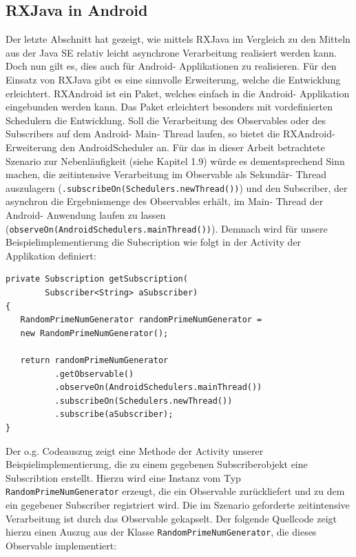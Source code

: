 \documentclass[12pt,oneside,a4paper,bibtotoc,liststotoc]{scrreprt}
\begin{document}
\subsection{RXJava in Android}
Der letzte Abschnitt hat gezeigt, wie mittels RXJava im Vergleich zu den Mitteln aus der Java SE relativ leicht asynchrone Verarbeitung realisiert werden kann. Doch nun gilt es, dies auch für Android- Applikationen zu realisieren. Für den Einsatz von RXJava gibt es eine sinnvolle Erweiterung, welche die Entwicklung erleichtert. RXAndroid ist ein Paket, welches einfach in die Android- Applikation eingebunden werden kann. Das Paket erleichtert besonders mit vordefinierten Schedulern die Entwicklung. Soll die Verarbeitung des Observables oder des Subscribers auf dem Android- Main- Thread laufen, so bietet die RXAndroid- Erweiterung den AndroidScheduler an. Für das in dieser Arbeit betrachtete Szenario zur Nebenläufigkeit (siehe Kapitel 1.9) würde es dementsprechend Sinn machen, die zeitintensive Verarbeitung im Observable als Sekundär- Thread auszulagern (\texttt{.subscribeOn(Schedulers.newThread())}) und den Subscriber, der asynchron die Ergebnismenge des Observables erhält, im Main- Thread der Android- Anwendung laufen zu lassen (\texttt{observeOn(AndroidSchedulers.mainThread())}). Demnach wird für unsere Beispielimplementierung die Subscription wie folgt in der Activity der Applikation definiert:\newline
\begin{lstlisting}
private Subscription getSubscription(
		Subscriber<String> aSubscriber) 
{
   RandomPrimeNumGenerator randomPrimeNumGenerator = 
   new RandomPrimeNumGenerator();

   return randomPrimeNumGenerator
          .getObservable()
          .observeOn(AndroidSchedulers.mainThread())
          .subscribeOn(Schedulers.newThread())
          .subscribe(aSubscriber);
}
\end{lstlisting}
Der o.g. Codeauszug zeigt eine Methode der Activity unserer Beispielimplementierung, die zu einem gegebenen Subscriberobjekt eine Subscribtion erstellt. Hierzu wird eine Instanz vom Typ \texttt{RandomPrimeNumGenerator} erzeugt, die ein Observable zurückliefert und zu dem ein gegebener Subscriber registriert wird. Die im Szenario geforderte zeitintensive Verarbeitung ist durch das Observable gekapselt. Der folgende Quellcode zeigt hierzu einen Auszug aus der Klasse \texttt{RandomPrimeNumGenerator}, die dieses Observable implementiert:\newline
\end{document}
